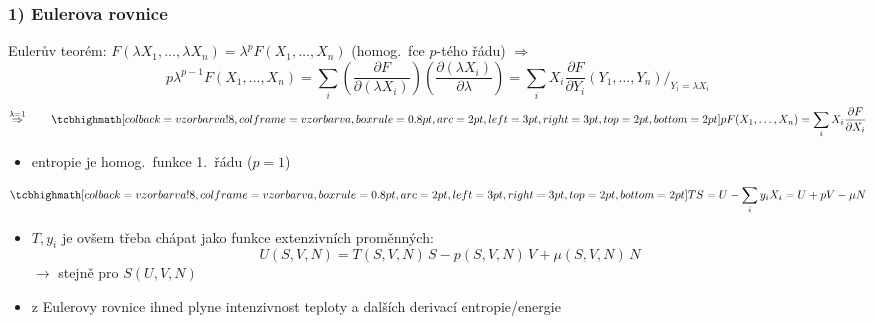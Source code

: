 \subsubsection*{1) Eulerova rovnice}
Eulerův teorém: \quad $F(\lambda X_1,\dots,\lambda X_n) = \lambda^pF(X_1,\dots,X_n)$ \quad (homog.\ fce $p$-tého řádu) $\Rightarrow$
\[
  p\lambda^{p-1}F(X_1,\dots,X_n) = \sum_i\left(\frac{\partial F}{\partial(\lambda X_i)}\right)\left(\frac{\partial(\lambda X_i)}{\partial\lambda}\right)
  = \sum_i X_i\frac{\partial F}{\partial Y_i}(Y_1,\dots,Y_n)\Big/_{Y_i = \lambda X_i}
\]
\[
  \overset{\lambda = 1}{\Rightarrow}\qquad \vzorec{pF(X_1,\dots,X_n) = \sum_i X_i\pdv{F}{X_i}}
\]
\begin{itemize}
  \item entropie je homog.\ funkce 1.\ řádu ($p = 1$)
\end{itemize}
\begin{veta}
\[
  \vzorec{TS = U - \sum_i y_iX_i = U + pV - \mu N}
\]
\end{veta}
\begin{itemize}
  \item $T, y_i$ je ovšem třeba chápat jako funkce extenzivních proměnných:
  \[
    U(S,V,N) = T(S,V,N)\,S - p(S,V,N)\,V + \mu(S,V,N)\,N
  \]
  $\to$ stejně pro $S(U,V,N)$
  \item z Eulerovy rovnice ihned plyne intenzivnost teploty a dalších derivací entropie/energie
\end{itemize}

